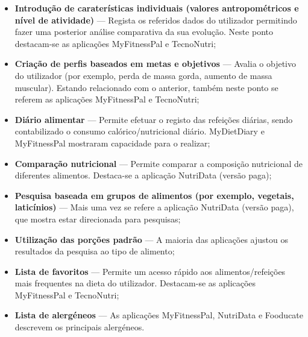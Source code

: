 \documentclass[twocolumn,twoside,11pt,a4paper]{article}
\begin{document}
\begin{itemize}
 \item   \textbf{Introdução de caraterísticas individuais (valores antropométricos e nível de atividade)} — Regista os referidos dados do utilizador permitindo fazer uma posterior análise comparativa da sua evolução. Neste ponto destacam-se as aplicações MyFitnessPal e TecnoNutri;
 \item    \textbf{Criação de perfis baseados em metas e objetivos} — Avalia o objetivo do utilizador (por exemplo, perda de massa gorda, aumento de massa muscular). Estando relacionado com o anterior, também neste ponto se referem as aplicações MyFitnessPal e TecnoNutri;
 \item   \textbf{Diário alimentar} — Permite efetuar o registo das refeições diárias, sendo contabilizado o consumo calórico/nutricional diário. MyDietDiary e MyFitnessPal mostraram capacidade para o realizar;
 \item    \textbf{Comparação nutricional} — Permite comparar a composição nutricional de diferentes alimentos. Destaca-se a aplicação NutriData (versão paga);
 \item   \textbf{Pesquisa baseada em grupos de alimentos (por exemplo, vegetais, laticínios)} — Mais uma vez se refere a aplicação NutriData (versão paga), que mostra estar  direcionada para pesquisas;
 \item    \textbf{Utilização das porções padrão} — A maioria das aplicações ajustou os resultados da pesquisa ao tipo de alimento;
 \item    \textbf{Lista de favoritos} — Permite um acesso rápido aos alimentos/refeições mais frequentes na dieta do utilizador. Destacam-se as aplicações MyFitnessPal e TecnoNutri;
 \item	  \textbf{Lista de alergéneos} — As aplicações MyFitnessPal, NutriData e Fooducate descrevem os principais alergéneos.
\end{itemize}
\end{document}
